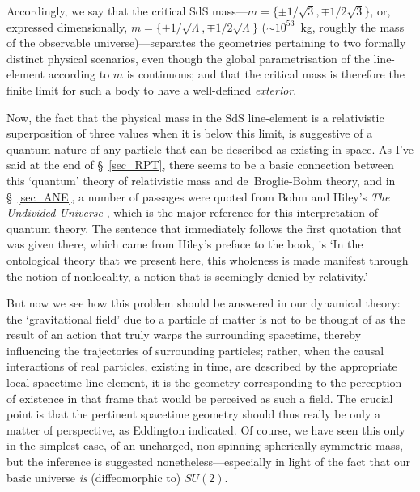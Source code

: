 Accordingly, we say that the critical SdS mass---$m=\{\pm1/\sqrt{3},\mp1/2\sqrt{3}\}$, or, expressed dimensionally, $m=\{\pm1/\sqrt{\Lambda},\mp1/2\sqrt{\Lambda}\}$ ($\sim10^{53}$~kg, roughly the mass of the observable universe)---separates the geometries pertaining to two formally distinct physical scenarios, even though the global parametrisation of the line-element according to $m$ is continuous; and that the critical mass is therefore the finite limit for such a body to have a well-defined \textit{exterior}. 

Now, the fact that the physical mass in the SdS line-element is a relativistic superposition of three values when it is below this limit, is suggestive of a quantum nature of any particle that can be described as existing in space. As I've said at the end of \S~\ref{sec_RPT}, there seems to be a basic connection between this `quantum' theory of relativistic mass and de~Broglie-Bohm theory, and in \S~\ref{sec_ANE}, a number of passages were quoted from Bohm and Hiley's \textit{The Undivided Universe} \cite{Bohm1993}, which is the major reference for this interpretation of quantum theory. The sentence that immediately follows the first quotation that was given there, which came from Hiley's preface to the book, is `In the ontological theory that we present here, this wholeness is made manifest through the notion of nonlocality, a notion that is seemingly denied by relativity.'

But now we see how this problem should be answered in our dynamical theory: the `gravitational field' due to a particle of matter is not to be thought of as the result of an action that truly warps the surrounding spacetime, thereby influencing the trajectories of surrounding particles; rather, when the causal interactions of real particles, existing in time, are described by the appropriate local spacetime line-element, it is the geometry corresponding to the perception of existence in that frame that would be perceived as such a field. The crucial point is that the pertinent spacetime geometry should thus really be only a matter of perspective, as Eddington indicated. Of course, we have seen this only in the simplest case, of an uncharged, non-spinning spherically symmetric mass, but the inference is suggested nonetheless---especially in light of the fact that our basic universe \textit{is} (diffeomorphic to) $SU(2)$.

